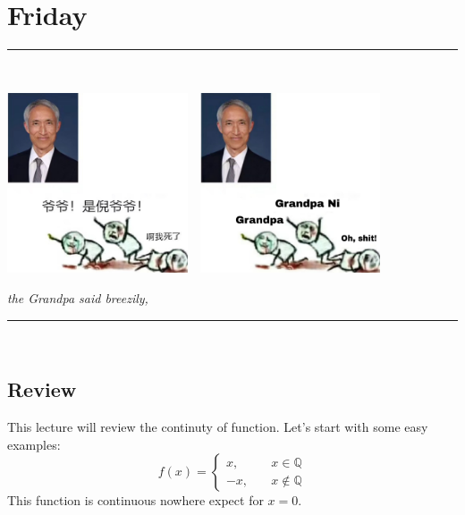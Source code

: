 \section{Friday}

\newcommand{\HRule}{\rule{\linewidth}{0.5mm}}
\HRule \\[0.5cm]
{
\begin{center}
 \centering\includegraphics[width=0.4\textwidth]{./logo}~\ 
 \includegraphics[width=0.4\textwidth]{./logo_1}~\
 \end{center}
   \textit{the Grandpa said breezily,}
}

\HRule \\[0.5cm]
\subsection{Review}
This lecture will review the continuty of function. Let's start with some easy examples:
\[
f(x)=\left\{
\begin{aligned}
x,&\quad x\in\mathbb{Q}\\
-x,&\quad x\notin\mathbb{Q}
\end{aligned}
\right.
\]
This function is continuous nowhere expect for $x=0$.

